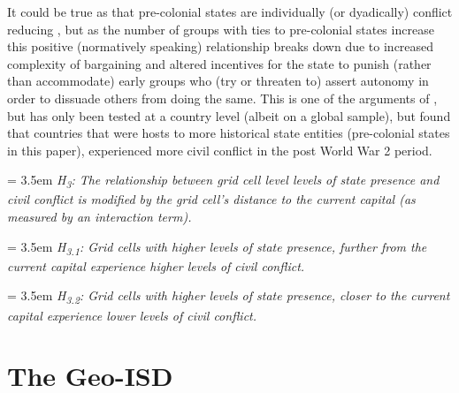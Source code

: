 \documentclass[12pt]{article}
\begin{document}
It could be true as that pre-colonial states are individually (or dyadically)
conflict reducing \citep{Pinker2012, Wig2016}, but as the number of groups with
ties to pre-colonial states increase this positive (normatively speaking)
relationship breaks down due to increased complexity of bargaining
\citep{Walter2009} and altered incentives for the state to punish (rather than
accommodate) early groups who (try or threaten to) assert autonomy in order to
dissuade others from doing the same. This is one of the arguments of
\citet{Wishman}, but has only been tested at a country level (albeit on a global
sample), but found that countries that were hosts to more historical state
entities (pre-colonial states in this paper), experienced more civil conflict in
the post World War 2 period. 

\bigskip

\hangindent = 3.5em \textit{H\textsubscript{3}: The relationship between grid
cell level levels of state presence and civil conflict is modified by the grid
cell's distance to the current capital (as measured by an interaction term).}

\bigskip

\hangindent = 3.5em \textit{H\textsubscript{3.1}: Grid cells with higher levels of
state presence, further from the current capital experience higher levels of
civil conflict.}

\bigskip

\hangindent = 3.5em \textit{H\textsubscript{3.2}: Grid cells with higher
levels of state presence, closer to the current capital experience lower levels
of civil conflict.} 

\bigskip

\section{The Geo-ISD}
\end{document}
